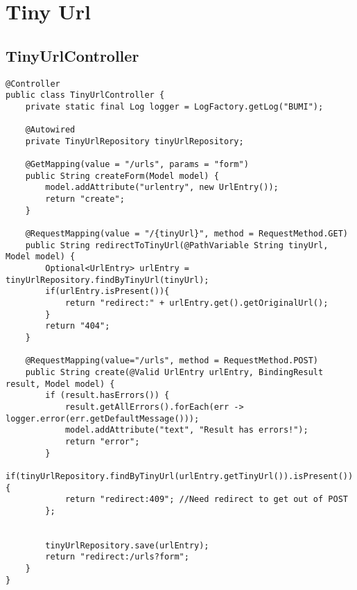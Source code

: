 \section{Tiny Url}
\subsection{TinyUrlController}
\begin{verbatim}
@Controller
public class TinyUrlController {
    private static final Log logger = LogFactory.getLog("BUMI");

    @Autowired
    private TinyUrlRepository tinyUrlRepository;

    @GetMapping(value = "/urls", params = "form")
    public String createForm(Model model) {
        model.addAttribute("urlentry", new UrlEntry());
        return "create";
    }

    @RequestMapping(value = "/{tinyUrl}", method = RequestMethod.GET)
    public String redirectToTinyUrl(@PathVariable String tinyUrl, Model model) {
        Optional<UrlEntry> urlEntry = tinyUrlRepository.findByTinyUrl(tinyUrl);
        if(urlEntry.isPresent()){
            return "redirect:" + urlEntry.get().getOriginalUrl();
        }
        return "404";
    }

    @RequestMapping(value="/urls", method = RequestMethod.POST)
    public String create(@Valid UrlEntry urlEntry, BindingResult result, Model model) {
        if (result.hasErrors()) {
            result.getAllErrors().forEach(err -> logger.error(err.getDefaultMessage()));
            model.addAttribute("text", "Result has errors!");
            return "error";
        }
        if(tinyUrlRepository.findByTinyUrl(urlEntry.getTinyUrl()).isPresent()){
            return "redirect:409"; //Need redirect to get out of POST
        };


        tinyUrlRepository.save(urlEntry);
        return "redirect:/urls?form";
    }
}
\end{verbatim}
